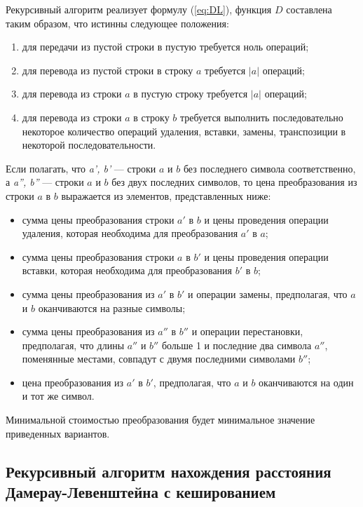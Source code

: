Рекурсивный алгоритм реализует формулу (\ref{eq:DL}), функция $D$ составлена таким образом, что истинны следующее положения:
\begin{enumerate}
	\item для передачи из пустой строки в пустую требуется ноль операций;
	\item для перевода из пустой строки в строку $a$ требуется $|a|$ операций;
	\item для перевода из строки $a$ в пустую строку требуется $|a|$ операций;
	\item для перевода из строки $a$ в строку $b$ требуется выполнить последовательно некоторое количество операций удаления, вставки, замены, транспозиции в некоторой последовательности.
\end{enumerate}

Если полагать, что \textit{a', b'} --- строки $a$ и $b$ без последнего символа соответственно, а \textit{a'', b''} --- строки $a$ и $b$ без двух последних символов, то цена преобразования из строки $a$ в $b$ выражается из элементов, представленных ниже:
\begin{itemize}[label=---]
	\item сумма цены преобразования строки $a'$ в $b$ и цены проведения операции удаления, которая необходима для преобразования $a'$ в $a$;
	\item сумма цены преобразования строки $a$ в $b'$  и цены проведения операции вставки, которая необходима для преобразования $b'$ в $b$;
	\item сумма цены преобразования из $a'$ в $b'$ и операции замены, предполагая, что $a$ и $b$ оканчиваются на разные символы;
	\item сумма цены преобразования из $a''$ в $b''$ и операции перестановки, предполагая, что длины $a''$ и $b''$ больше 1 и последние два символа $a''$, поменянные местами, совпадут с двумя последними символами $b''$;
	\item цена преобразования из $a'$ в $b'$, предполагая, что $a$ и $b$ оканчиваются на один и тот же символ.
\end{itemize}

Минимальной стоимостью преобразования будет минимальное значение приведенных вариантов.

\subsection{Рекурсивный алгоритм нахождения расстояния Дамерау-Левенштейна с кешированием}

